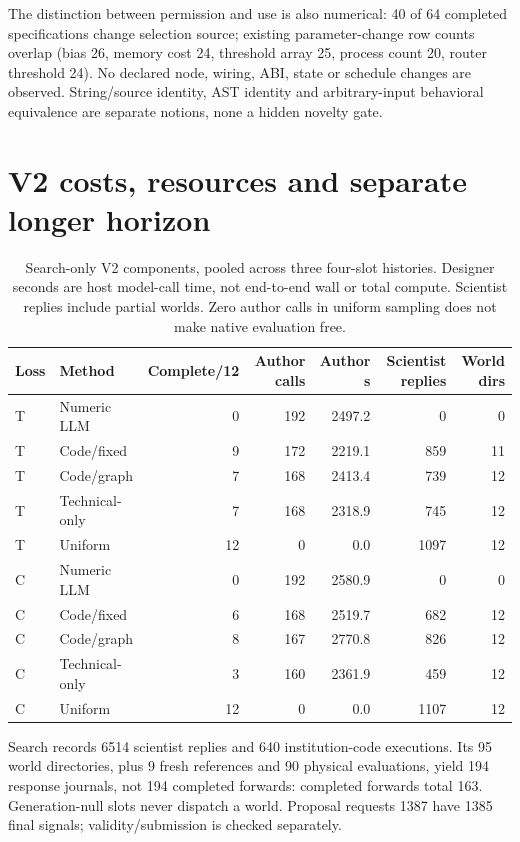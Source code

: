The distinction between permission and use is also numerical: 40 of 64 completed
specifications change selection source; existing parameter-change row counts
overlap (bias 26, memory cost 24, threshold array 25, process count 20, router
threshold 24). No declared node, wiring, ABI, state or schedule changes are observed.
String/source identity, AST identity and arbitrary-input behavioral equivalence
are separate notions, none a hidden novelty gate.

\FloatBarrier
\section{V2 costs, resources and separate longer horizon}
\label{app:costs}
\begin{table}[h]\centering\small
\caption{Search-only V2 components, pooled across three four-slot histories.
Designer seconds are host model-call time, not end-to-end wall or total compute.
Scientist replies include partial worlds. Zero author calls in uniform sampling
does not make native evaluation free.}
\label{tab:integrated-method-costs}
\begin{tabular}{llrrrrr}\toprule
Loss&Method&Complete/12&Author calls&Author s&Scientist replies&World dirs\\\midrule
T&Numeric LLM&0&192&2497.2&0&0\\
T&Code/fixed&9&172&2219.1&859&11\\
T&Code/graph&7&168&2413.4&739&12\\
T&Technical-only&7&168&2318.9&745&12\\
T&Uniform&12&0&0.0&1097&12\\\addlinespace
C&Numeric LLM&0&192&2580.9&0&0\\
C&Code/fixed&6&168&2519.7&682&12\\
C&Code/graph&8&167&2770.8&826&12\\
C&Technical-only&3&160&2361.9&459&12\\
C&Uniform&12&0&0.0&1107&12\\\bottomrule
\end{tabular}\end{table}

Search records 6514 scientist replies and 640 institution-code executions. Its 95
world directories, plus 9 fresh references and 90 physical evaluations, yield 194
response journals, not 194 completed forwards: completed forwards total 163.
Generation-null slots never dispatch a world. Proposal requests 1387 have 1385
final signals; validity/submission is checked separately.

